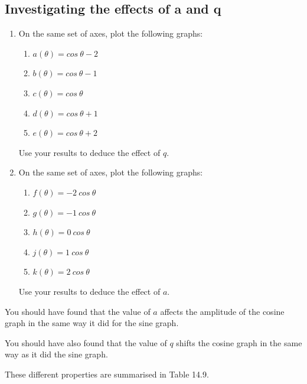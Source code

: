 \subsection*{Investigating the effects of a and q}
\nopagebreak
\begin{enumerate}[noitemsep, label=\textbf{\arabic*}. ] 
\item On the same set of axes, plot the following graphs:
\begin{enumerate}[noitemsep, label=\textbf{\alph*}. ] 
\item $a(\theta )=cos~\theta -2$
\item $b(\theta )=cos~\theta -1$
\item $c(\theta )=cos~\theta $
\item $d(\theta )=cos~\theta +1$
\item $e(\theta )=cos~\theta +2$\end{enumerate}
Use your results to deduce the effect of $q$.
\item On the same set of axes, plot the following graphs:
\begin{enumerate}[noitemsep, label=\textbf{\alph*}. ] 
\item $f(\theta )=-2~cos~\theta $
\item $g(\theta )=-1~cos~\theta $
\item $h(\theta )=0~cos~\theta $
\item $j(\theta )=1~cos~\theta $
\item $k(\theta )=2~cos~\theta $\end{enumerate}
Use your results to deduce the effect of $a$.
\end{enumerate}
You should have found that the value of $a$ affects the amplitude of the cosine graph in the same way it did for the sine graph.\par 
You should have also found that the value of $q$ shifts the cosine graph in the same way as it did the sine graph.\par 
These different properties are summarised in Table 14.9.\par 
